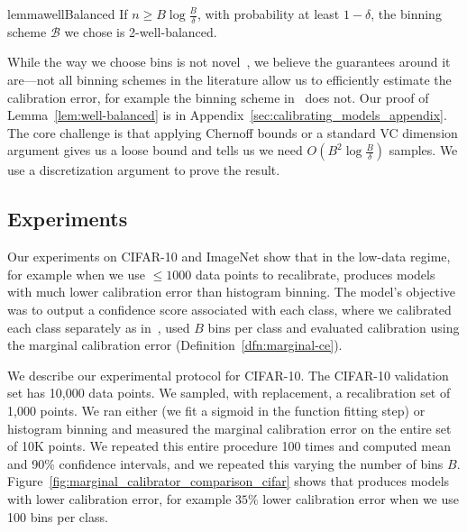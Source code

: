 \begin{restatable}{lemma}{wellBalanced}
\label{lem:well-balanced}
If $n \geq B\log{\frac{B}{\delta}}$, with probability at least $1 - \delta$, the binning scheme $\mathcal{B}$ we chose is 2-well-balanced.
\end{restatable}

While the way we choose bins is not novel~\cite{zadrozny2001calibrated}, we believe the guarantees around it are---not all binning schemes in the literature allow us to efficiently estimate the calibration error, for example the binning scheme in~\cite{guo2017calibration} does not. Our proof of Lemma~\ref{lem:well-balanced} is in Appendix~\ref{sec:calibrating_models_appendix}. The core challenge is that applying Chernoff bounds or a standard VC dimension argument gives us a loose bound and tells us we need $O(B^2\log{\frac{B}{\delta}})$ samples. We use a discretization argument to prove the result.

\subsection{Experiments}

Our experiments on CIFAR-10 and ImageNet show that in the low-data regime, for example when we use $\leq 1000$ data points to recalibrate, \ourcal{} produces models with much lower calibration error than histogram binning. The model's objective was to output a confidence score associated with each class, where we calibrated each class separately as in~\cite{zadrozny2002transforming}, used $B$ bins per class and evaluated calibration using the marginal calibration error (Definition~\ref{dfn:marginal-ce}).

We describe our experimental protocol for CIFAR-10.
The CIFAR-10 validation set has 10,000 data points. We sampled, with replacement, a recalibration set of 1,000 points. We ran either \ourcal{} (we fit a sigmoid in the function fitting step) or histogram binning and measured the marginal calibration error on the entire set of 10K points.
We repeated this entire procedure 100 times and computed mean and 90\% confidence intervals, and we repeated this varying the number of bins $B$. Figure~\ref{fig:marginal_calibrator_comparison_cifar} shows that \ourcal{} produces models with lower calibration error, for example $35\%$ lower calibration error when we use 100 bins per class.

